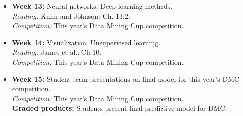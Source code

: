 \documentclass[11pt,oneside]{amsart}
\begin{document}
\begin{itemize}
\item \textbf{Week 13:} Neural networks. Deep learning methods. \\
\emph{Reading:} Kuhn and Johnson: Ch. 13.2. \\
\emph{Competition:} This year's Data Mining Cup competition.

\item \textbf{Week 14:} Visualization. Unsupervised learning.\\
\emph{Reading:} James et al.: Ch 10. \\
\emph{Competition:} This year's Data Mining Cup competition.

\item \textbf{Week 15:} Student team presentations on final model for
  this year's DMC  competition.\\
\emph{Competition:} This year's Data Mining Cup competition.\\
\textbf{Graded products:} Students present final predictive model for
DMC.

\end{itemize}
\end{document}
